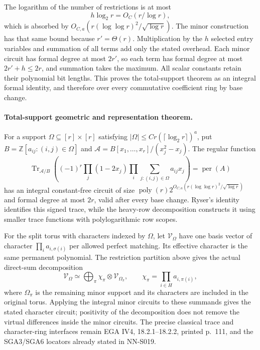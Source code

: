 The logarithm of the number of restrictions is at most
\[
                   h\log_2r=O_C(r/\log r),
\]
which is absorbed by
$O_{C,a}(r(\log\log r)^2/\sqrt{\log r})$.
The minor construction has that same bound because
$r'=\Theta(r)$.  Multiplication by the $h$ selected entry
variables and summation of all terms add only the stated
overhead.  Each minor circuit has formal degree at most
$2r'$, so each term has formal degree at most
$2r'+h\le2r$, and summation takes the maximum.  All scalar
constants retain their polynomial bit lengths.  This
proves the total-support theorem as an integral formal
identity, and therefore over every commutative coefficient
ring by base change.

\paragraph{Total-support geometric and representation theorem.}
For a support $\Omega\subseteq[r]\times[r]$ satisfying
$|\Omega|\le Cr(\lceil\log_2r\rceil)^a$, put
$B=\mathbb Z[a_{ij}:(i,j)\in\Omega]$ and
$\mathscr A=B[x_1,\ldots,x_r]/(x_j^2-x_j)$.  The regular
function
\[
 \operatorname{Tr}_{\mathscr A/B}\left(
     (-1)^r\prod_j(1-2x_j)
                 \prod_i\sum_{j:(i,j)\in\Omega}a_{ij}x_j\right)
                              =\operatorname{per}(A)
\]
has an integral constant-free circuit of size
$\operatorname{poly}(r)2^{O_{C,a}(r(\log\log r)^2/\sqrt{\log r})}$
and formal degree at most $2r$, valid after every base
change.  Ryser's identity identifies this signed trace,
while the heavy-row decomposition constructs it using
smaller trace functions with polylogarithmic row scopes.

For the split torus with characters indexed by $\Omega$,
let $\mathcal V_\Omega$ have one basis vector of character
$\prod_i a_{i,\sigma(i)}$ per allowed perfect matching.
Its effective character is the same permanent polynomial.
The restriction partition above gives the actual direct-sum
decomposition
\[
 \mathcal V_\Omega\simeq
  \bigoplus_{\pi}
    \chi_\pi\otimes\mathcal V_{\Omega_\pi},
 \qquad \chi_\pi=\prod_{i\in H}a_{i,\pi(i)},
\]
where $\Omega_\pi$ is the remaining minor support and its
characters are included in the original torus.  Applying
the integral minor circuits to these summands gives the
stated character circuit; positivity of the decomposition
does not remove the virtual differences inside the minor
circuits.  The precise classical trace and character-ring
interfaces remain EGA IV4, 18.2.1--18.2.2, printed p.~111,
and the SGA3/SGA6 locators already stated in NN-S019.
